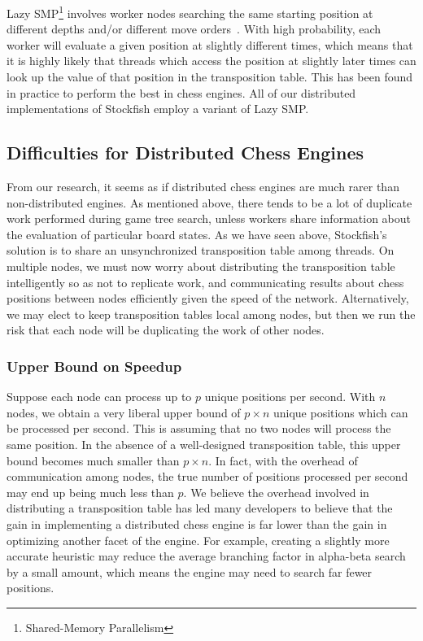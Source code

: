 \documentclass{article}
\begin{document}
Lazy SMP\footnote{Shared-Memory Parallelism} involves worker nodes searching the
same starting position at different depths and/or different move
orders~\cite{LazySMP}.
With high probability, each worker will evaluate a given position at
slightly different times, which means that it is highly likely that
threads which access the position at slightly later times
can look up the value of that position in the transposition table. This has
been found in practice to perform the best in chess engines. All
of our distributed implementations of Stockfish employ a variant of Lazy SMP.

\subsection{Difficulties for Distributed Chess Engines}
From our research, it seems as if distributed chess engines are much rarer than
non-distributed engines. 
As mentioned above, there tends to be a lot of duplicate work performed during
game tree search, unless workers share information about the evaluation of
particular board states. As we have seen above, Stockfish's
solution is to share an unsynchronized transposition table among threads. On
multiple nodes, we must now worry about distributing the transposition table
intelligently so as not to replicate work, and communicating results about chess positions between
nodes efficiently given the speed of the network. Alternatively, we may elect
to keep transposition tables local among nodes, but then we run the risk that
each node will be duplicating the work of other nodes.

\subsubsection{Upper Bound on Speedup}
Suppose each node can process up to $p$ unique positions per second. With $n$ nodes, we
obtain a very liberal upper bound of $p\times n$ unique positions which can be processed per
second. This is assuming that no two nodes will process the same position. In
the absence of a well-designed transposition table, this upper bound becomes
much smaller than $p \times n$. In fact, with the overhead of communication
among nodes, the true number of positions processed per second may end up being
much less than $p$. We believe the overhead involved in distributing a
transposition table has led many developers to believe that the gain in
implementing a distributed chess engine is far lower than the gain in
optimizing another facet of the engine. For example, creating a slightly
more accurate heuristic may reduce the average branching factor in alpha-beta
search by a small amount, which means the engine may need to search far fewer
positions.
\end{document}
